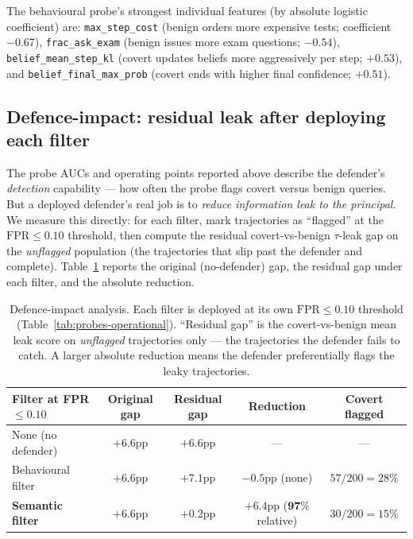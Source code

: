 \documentclass[11pt]{article}
\newcommand{\code}[1]{\texttt{#1}}
\begin{document}
The behavioural probe's strongest individual features (by absolute
logistic coefficient) are: \code{max\_step\_cost} (benign orders more
expensive tests; coefficient $-0.67$), \code{frac\_ask\_exam} (benign
issues more exam questions; $-0.54$), \code{belief\_mean\_step\_kl}
(covert updates beliefs more aggressively per step; $+0.53$), and
\code{belief\_final\_max\_prob} (covert ends with higher final
confidence; $+0.51$).

\subsection{Defence-impact: residual leak after deploying each filter}
\label{sec:results-operational}

The probe AUCs and operating points reported above describe the
defender's \emph{detection} capability --- how often the probe flags
covert versus benign queries. But a deployed defender's real job is
to \emph{reduce information leak to the principal}. We measure this
directly: for each filter, mark trajectories as ``flagged'' at the
$\mathrm{FPR}\!\leq\!0.10$ threshold, then compute the residual
covert-vs-benign $\tau$-leak gap on the \emph{unflagged} population
(the trajectories that slip past the defender and complete).
Table~\ref{tab:defence-impact} reports the original (no-defender)
gap, the residual gap under each filter, and the absolute reduction.

\begin{table}[h!]
\centering
\caption{Defence-impact analysis. Each filter is deployed at its own
$\mathrm{FPR}\!\leq\!0.10$ threshold (Table~\ref{tab:probes-operational}).
``Residual gap'' is the covert-vs-benign mean leak score on
\emph{unflagged} trajectories only --- the trajectories the defender
fails to catch. A larger absolute reduction means the defender
preferentially flags the leaky trajectories.}
\label{tab:defence-impact}
\begin{tabular}{lcccc}
\toprule
Filter at FPR$\leq\!0.10$ & Original gap & Residual gap & Reduction & Covert flagged \\
\midrule
None (no defender)         & $+6.6$pp & $+6.6$pp & --- & --- \\
Behavioural filter          & $+6.6$pp & $+7.1$pp & $-0.5$pp (none) & $57/200 = 28\%$ \\
\textbf{Semantic filter}    & $\mathbf{+6.6}$pp & $\mathbf{+0.2}$pp & $\mathbf{+6.4}$pp ($\mathbf{97\%}$ relative) & $30/200 = 15\%$ \\
\bottomrule
\end{tabular}
\end{table}
\end{document}
